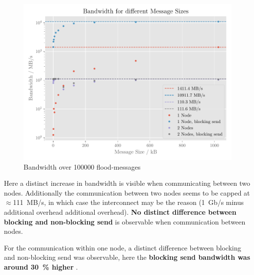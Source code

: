 \documentclass[]{scrartcl}
\begin{document}
\begin{figure}[ht]
    \centering
    \includegraphics[width=\linewidth]{img/bandwidth}
    \caption{Bandwidth over 100000 flood-messages}%
    \label{fig:bandwidth}
\end{figure}

Here a distinct increase in bandwidth is visible when communicating between two nodes.
Additionally the communication between two nodes seems to be capped at $\approx$\SI{111}{MB/s}, in which case the interconnect may be the reason (\SI{1}{Gb/s} minus additional overhead additional overhead).
{\bfseries No distinct difference between blocking and non-blocking send} is observable when communication between nodes.

For the communication within one node, a distinct difference between blocking and non-blocking send was observable, here the {\bfseries blocking send bandwidth was around \SI{30}{\%} higher }.
\newpage
\end{document}
